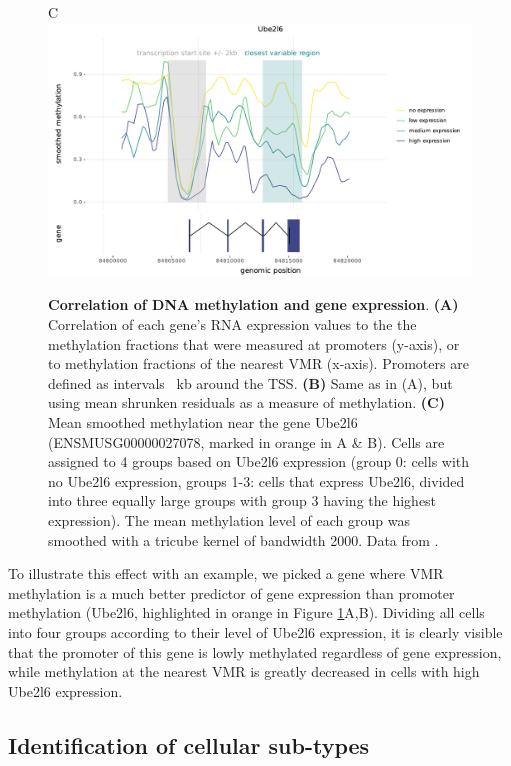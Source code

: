 \documentclass[twocolumn,10pt]{article}
\begin{document}
\begin{figure}
\begin{center}
    C\hspace{.9\columnwidth}~\\
    \includegraphics[width=.95\columnwidth]{part_leonie_git/leonie_plots/comparison_meth_RNA.pdf}
    \end{center}
    \caption{\small \textbf{Correlation of DNA methylation and gene expression}.
    \textbf{(A)} Correlation of each gene's RNA expression values to the the methylation fractions that were measured at promoters (y-axis), or to methylation fractions of the nearest VMR (x-axis). Promoters are defined as intervals ~kb around the TSS.
    \textbf{(B)} Same as in (A), but using mean shrunken residuals as a measure of methylation.
    \textbf{(C)} Mean smoothed methylation near the gene Ube2l6 (ENSMUSG00000027078, marked in orange in A \& B). Cells are assigned to 4 groups based on Ube2l6 expression (group 0: cells with no Ube2l6 expression, groups 1-3: cells that express Ube2l6, divided into three equally large groups with group 3 having the highest expression). The mean methylation level of each group was smoothed with a tricube kernel of bandwidth 2000.
    Data from \citet{argelaguet2019gastru}.}
    \label{figure:correlation}
\end{figure}

To illustrate this effect with an example, we picked a gene where VMR methylation is a much better predictor of gene expression than promoter methylation (Ube2l6, highlighted in orange in Figure \ref{figure:correlation}A,B).
Dividing all cells into four groups according to their level of Ube2l6 expression, it is clearly visible that the promoter of this gene is lowly methylated regardless of gene expression, while methylation at the nearest VMR is greatly decreased in cells with high Ube2l6 expression.

\subsection{Identification of cellular sub-types}
\end{document}
